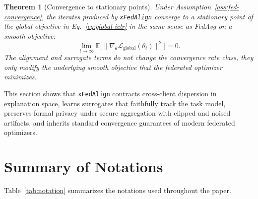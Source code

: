 \documentclass{article}
\theoremstyle{plain}
\newtheorem{theorem}{Theorem}[section]
\theoremstyle{definition}
\theoremstyle{remark}
\begin{document}
\begin{theorem}[Convergence to stationary points]
\label{thm:fed-convergence}
Under Assumption~\ref{ass:fed-convergence}, the iterates produced by
\texttt{xFedAlign} converge to a stationary point of the global objective in
Eq.~\eqref{eq:global-iclr} in the same sense as FedAvg on a smooth objective:
\[
\lim_{t\to\infty}\mathbb{E}\big[\|\nabla_\theta \mathcal{L}_{\text{global}}(\theta_t)\|^2\big] = 0.
\]
The alignment and surrogate terms do not change the convergence rate class,
they only modify the underlying smooth objective that the federated optimizer
minimizes.
\end{theorem}

This section shows that \texttt{xFedAlign} contracts cross-client dispersion
in explanation space, learns surrogates that faithfully track the task model,
preserves formal privacy under secure aggregation with clipped and noised
artifacts, and inherits standard convergence guarantees of modern federated
optimizers.



\section{Summary of Notations}
\label{app:notation}

Table~\ref{tab:notation} summarizes the notations used throughout the paper.
\end{document}
